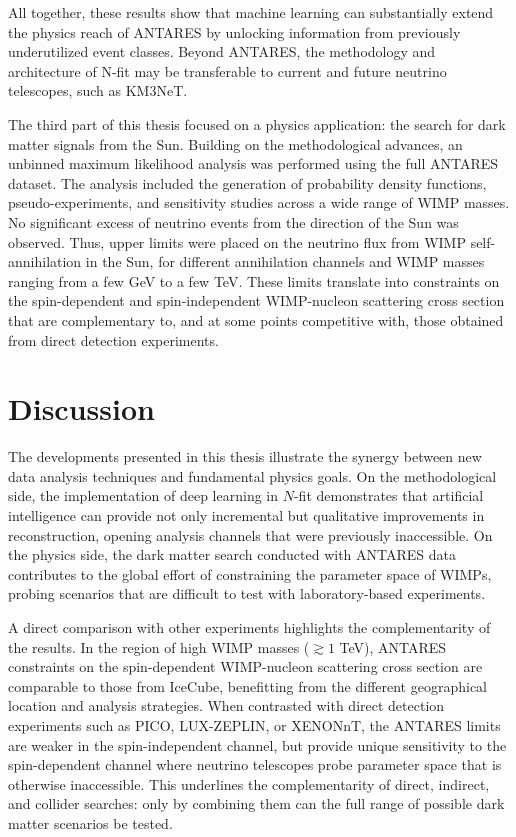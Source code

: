 All together, these results show that machine learning can substantially extend the physics reach of ANTARES by unlocking information from previously underutilized event classes. Beyond ANTARES, the methodology and architecture of N-fit may be transferable to current and future neutrino telescopes, such as KM3NeT.

The third part of this thesis focused on a physics application: the search for dark matter signals from the Sun. Building on the methodological advances, an unbinned maximum likelihood analysis was performed using the full ANTARES dataset. The analysis included the generation of probability density functions, pseudo-experiments, and sensitivity studies across a wide range of WIMP masses. No significant excess of neutrino events from the direction of the Sun was observed. Thus, upper limits were placed on the neutrino flux from WIMP self-annihilation in the Sun, for different annihilation channels and WIMP masses ranging from a few GeV to a few TeV. These limits translate into constraints on the spin-dependent and spin-independent WIMP-nucleon scattering cross section that are complementary to, and at some points competitive with, those obtained from direct detection experiments.

\section*{Discussion}

The developments presented in this thesis illustrate the synergy between new data analysis techniques and fundamental physics goals. On the methodological side, the implementation of deep learning in $N$-fit demonstrates that artificial intelligence can provide not only incremental but qualitative improvements in reconstruction, opening analysis channels that were previously inaccessible. On the physics side, the dark matter search conducted with ANTARES data contributes to the global effort of constraining the parameter space of WIMPs, probing scenarios that are difficult to test with laboratory-based experiments.

A direct comparison with other experiments highlights the complementarity of the results. In the region of high WIMP masses ($\gtrsim 1$ TeV), ANTARES constraints on the spin-dependent WIMP-nucleon scattering cross section are comparable to those from IceCube, benefitting from the different geographical location and analysis strategies. %
When contrasted with direct detection experiments such as PICO, LUX-ZEPLIN, or XENONnT, the ANTARES limits are weaker in the spin-independent channel, but provide unique sensitivity to the spin-dependent channel where neutrino telescopes probe parameter space that is otherwise inaccessible. This underlines the complementarity of direct, indirect, and collider searches: only by combining them can the full range of possible dark matter scenarios be tested.

